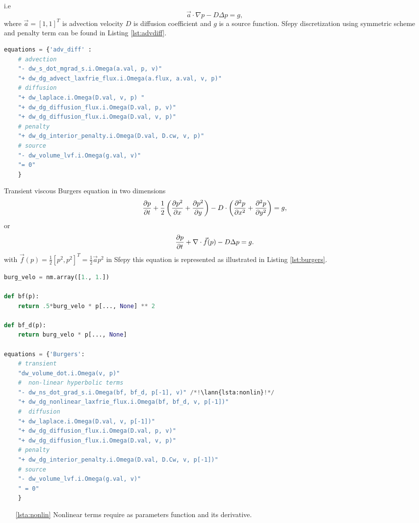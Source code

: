 i.e
\begin{equation}
\vec{a} \cdot \nabla p - D \Delta p = g,
\end{equation}
where $\vec{a} = [1, 1]^T$ is advection velocity $D$ is diffusion coefficient and $g$ is 
a source function. Sfepy discretization using symmetric scheme and penalty term can be 
found in Listing 
\ref{lst:advdiff}.
\setcounter{lstannotation}{0}
\begin{lstlisting}[language=Python, caption=Static advection-diffusion equation
\label{lst:advdiff}]
equations = {'adv_diff' :
	# advection
	"- dw_s_dot_mgrad_s.i.Omega(a.val, p, v)"
	"+ dw_dg_advect_laxfrie_flux.i.Omega(a.flux, a.val, v, p)"
	# diffusion
	"+ dw_laplace.i.Omega(D.val, v, p) "
	"+ dw_dg_diffusion_flux.i.Omega(D.val, p, v)"
	"+ dw_dg_diffusion_flux.i.Omega(D.val, v, p)"
	# penalty
	"+ dw_dg_interior_penalty.i.Omega(D.val, D.cw, v, p)"
	# source
	"- dw_volume_lvf.i.Omega(g.val, v)"
	"= 0"
	}
\end{lstlisting}
Transient viscous Burgers equation in two dimensions
\begin{equation}
\label{eq:ex_burgers}
	\frac{\partial p}{\partial t} + \frac{1}{2}\left(\frac{\partial p^2}{\partial x} + \frac{\partial p^2}{\partial y}\right)  - 
	D \cdot \left( \frac{\partial^2 p}{\partial x^2} + \frac{\partial^2 p}{\partial y^2} \right) 
	= g,
\end{equation}
or
\begin{equation}
	\frac{\partial p}{\partial t} + \nabla \cdot \vec{f}(p) - D\Delta p = g.
\end{equation}
with $\vec{f}(p) = \frac{1}{2}[p^2, p^2]^T = \frac{1}{2}\vec{a} p^2$ in Sfepy this 
equation is represented as illustrated in Listing \ref{lst:burgers}.
\setcounter{lstannotation}{0}
\begin{lstlisting}[language=Python, caption=Viscous Burgers equation \label{lst:burgers}]
burg_velo = nm.array([1., 1.])

def bf(p):
	return .5*burg_velo * p[..., None] ** 2

def bf_d(p):
	return burg_velo * p[..., None]

equations = {'Burgers':
	# transient
	"dw_volume_dot.i.Omega(v, p)"
	#  non-linear hyperbolic terms
	"- dw_ns_dot_grad_s.i.Omega(bf, bf_d, p[-1], v)" /*!\lann{lsta:nonlin}!*/
	"+ dw_dg_nonlinear_laxfrie_flux.i.Omega(bf, bf_d, v, p[-1])"
	#  diffusion
	"+ dw_laplace.i.Omega(D.val, v, p[-1])"
	"+ dw_dg_diffusion_flux.i.Omega(D.val, p, v)"
	"+ dw_dg_diffusion_flux.i.Omega(D.val, v, p)"
	# penalty
	"+ dw_dg_interior_penalty.i.Omega(D.val, D.Cw, v, p[-1])"
	# source
	"- dw_volume_lvf.i.Omega(g.val, v)"
	" = 0"
	}
\end{lstlisting}
\begin{itemize}
	\item[\ref{lsta:nonlin}] Nonlinear terms require as parameters function and its 
	derivative.
\end{itemize}

